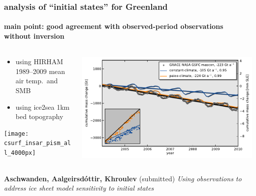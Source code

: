 \documentclass[hide notes,intlimits]{beamer}
\begin{document}
\begin{frame}
  \frametitle{analysis of ``initial states'' for Greenland}
  \framesubtitle{main point: good agreement with observed-period observations without inversion}

  \begin{columns}
  \begin{column}{0.4\textwidth}
  \begin{itemize}
  \item using HIRHAM 1989--2009 mean air temp.~and SMB 
  \item using ice2sea 1km bed topography
  \end{itemize}

    \texttt{[image: csurf\_insar\_pism\_all\_4000px]}
  \end{column}
  \begin{column}{0.6\textwidth}
    \includegraphics[width=1.0\textwidth]{ts_mass_2004-2009}
  \end{column}
  \end{columns}

  \begin{flushleft}
  \scriptsize \textbf{Aschwanden, A{\dh}algeirsd{\'o}ttir, Khroulev} (submitted) \emph{Using observations to address ice sheet model sensitivity to initial states}
 \end{flushleft}
\end{frame}
\end{document}
